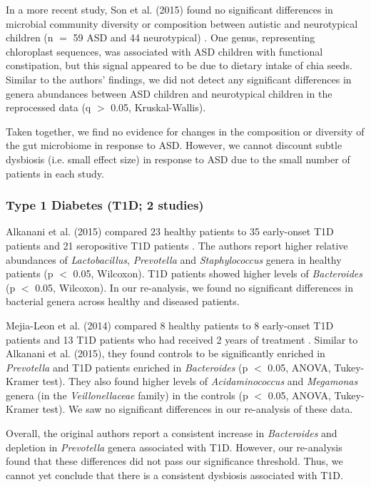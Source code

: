 In a more recent study, Son et al. (2015) found no significant differences in microbial community diversity or composition between autistic and neurotypical children (n $=$ 59 ASD and 44 neurotypical) \cite{asd-son}.
One genus, representing chloroplast sequences, was associated with ASD children with functional constipation, but this signal appeared to be due to dietary intake of chia seeds.
Similar to the authors’ findings, we did not detect any significant differences in genera abundances between ASD children and neurotypical children in the reprocessed data (q $>$ 0.05, Kruskal-Wallis).

Taken together, we find no evidence for changes in the composition or diversity of the gut microbiome in response to ASD.
However, we cannot discount subtle dysbiosis (i.e. small effect size) in response to ASD due to the small number of patients in each study.

\subsubsection{Type 1 Diabetes (T1D; 2 studies)}

Alkanani et al. (2015) compared 23 healthy patients to 35 early-onset T1D patients and 21 seropositive T1D patients \cite{t1d-alkanani}.
The authors report higher relative abundances of \textit{Lactobacillus}, \textit{Prevotella} and \textit{Staphylococcus} genera in healthy patients (p $<$ 0.05, Wilcoxon).
T1D patients showed higher levels of \textit{Bacteroides} (p $<$ 0.05, Wilcoxon).
In our re-analysis, we found no significant differences in bacterial genera across healthy and diseased patients.

Mejia-Leon et al. (2014) compared 8 healthy patients to 8 early-onset T1D patients and 13 T1D patients who had received 2 years of treatment \cite{t1d-mejia}.
Similar to Alkanani et al. (2015), they found controls to be significantly enriched in \textit{Prevotella} and T1D patients enriched in \textit{Bacteroides} (p $<$ 0.05, ANOVA, Tukey-Kramer test).
They also found higher levels of \textit{Acidaminococcus} and \textit{Megamonas} genera (in the \textit{Veillonellaceae} family) in the controls (p $<$ 0.05, ANOVA, Tukey-Kramer test).
We saw no significant differences in our re-analysis of these data.

Overall, the original authors report a consistent increase in \textit{Bacteroides} and depletion in \textit{Prevotella} genera associated with T1D.
However, our re-analysis found that these differences did not pass our significance threshold.
Thus, we cannot yet conclude that there is a consistent dysbiosis associated with T1D.

